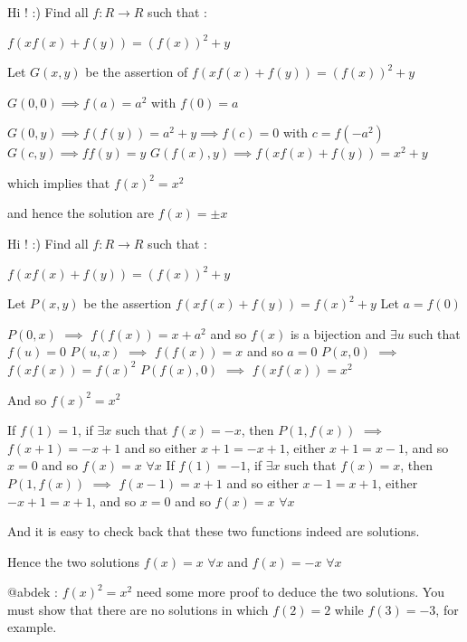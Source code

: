 \begin{solution}
	\begin{tcolorbox}Hi !  :) 
Find all $ f: R\rightarrow R$ such that :

$ f(xf(x) + f(y)) = (f(x))^2 + y$\end{tcolorbox}

Let $ G(x,y)$ be the assertion of $ f(xf(x) + f(y)) = (f(x))^2 + y$

$ G(0,0) \implies f(a) = a^2$ with $ f(0) = a$

$ G(0,y) \implies f(f(y)) = a^2 + y \implies f(c) = 0$ with $ c = f( - a^2)$
$ G(c,y) \implies ff(y) = y$
$ G(f(x),y) \implies f(xf(x) + f(y)) = x^2 + y$

which implies that $ f(x)^2 = x^2$

and hence the solution are $ f(x) = \pm x$
\end{solution}



\begin{solution}
	\begin{tcolorbox}Hi !  :) 
Find all $ f: R\rightarrow R$ such that :

$ f(xf(x) + f(y)) = (f(x))^2 + y$\end{tcolorbox}

Let $ P(x,y)$ be the assertion $ f(xf(x)+f(y))=f(x)^2+y$
Let $ a=f(0)$

$ P(0,x)$ $ \implies$ $ f(f(x))=x+a^2$ and so $ f(x)$ is a bijection and $ \exists u$ such that $ f(u)=0$
$ P(u,x)$ $ \implies$ $ f(f(x))=x$ and so $ a=0$
$ P(x,0)$ $ \implies$ $ f(xf(x))=f(x)^2$
$ P(f(x),0)$ $ \implies$ $ f(xf(x))=x^2$

And so $ f(x)^2=x^2$ 

If $ f(1)=1$, if $ \exists x$ such that $ f(x)=-x$, then $ P(1,f(x))$ $ \implies$ $ f(x+1)=-x+1$ and so either $ x+1=-x+1$, either $ x+1=x-1$, and so $ x=0$ and so $ f(x)=x$ $ \forall x$
If $ f(1)=-1$, if $ \exists x$ such that $ f(x)=x$, then $ P(1,f(x))$ $ \implies$ $ f(x-1)=x+1$ and so either $ x-1=x+1$, either $ -x+1=x+1$, and so $ x=0$ and so $ f(x)=x$ $ \forall x$

And it is easy to check back that these two functions indeed are solutions.

Hence the two solutions $ f(x)=x$ $ \forall x$ and $ f(x)=-x$ $ \forall x$

@abdek : $ f(x)^2=x^2$ need some more proof to deduce the two solutions. You must show that there are no solutions in which $ f(2)=2$ while $ f(3)=-3$, for example.
\end{solution}



